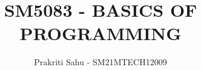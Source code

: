 \documentclass[journal,12pt,twocolumn]{IEEEtran}
\begin{document}
%


\newtheorem{theorem}{Theorem}[section]
\newtheorem{problem}{Problem}
\newtheorem{proposition}{Proposition}[section]
\newtheorem{lemma}{Lemma}[section]
\newtheorem{corollary}[theorem]{Corollary}
\newtheorem{example}{Example}[section]
\newtheorem{definition}[problem]{Definition}
\newcommand{\BEQA}{\begin{eqnarray}}
\newcommand{\EEQA}{\end{eqnarray}}
\newcommand{\define}{\stackrel{\triangle}{=}}

\providecommand{\mbf}{\mathbf}
\providecommand{\pr}[1]{\ensuremath{\Pr\left(#1\right)}}
\providecommand{\qfunc}[1]{\ensuremath{Q\left(#1\right)}}
\providecommand{\sbrak}[1]{\ensuremath{{}\left[#1\right]}}
\providecommand{\lsbrak}[1]{\ensuremath{{}\left[#1\right.}}
\providecommand{\rsbrak}[1]{\ensuremath{{}\left.#1\right]}}
\providecommand{\brak}[1]{\ensuremath{\left(#1\right)}}
\providecommand{\lbrak}[1]{\ensuremath{\left(#1\right.}}
\providecommand{\rbrak}[1]{\ensuremath{\left.#1\right)}}
\providecommand{\cbrak}[1]{\ensuremath{\left\{#1\right\}}}
\providecommand{\lcbrak}[1]{\ensuremath{\left\{#1\right.}}
\providecommand{\rcbrak}[1]{\ensuremath{\left.#1\right\}}}
\theoremstyle{remark}
\newtheorem{rem}{Remark}
\newcommand{\sgn}{\mathop{\mathrm{sign}}}
\providecommand{\abs}[1]{\left\vert#1\right\vert}
\providecommand{\res}[1]{\Res\displaylimits_{#1}} 
\providecommand{\norm}[1]{\left\lVert#1\right\rVert}
\providecommand{\mtx}[1]{\mathbf{#1}}
\providecommand{\mean}[1]{E\left[ #1 \right]}
\providecommand{\fourier}{\overset{\mathcal{F}}{ \rightleftharpoons}}
\providecommand{\system}{\overset{\mathcal{H}}{ \longleftrightarrow}}
\newcommand{\solution}{\noindent \textbf{Solution: }}
\newcommand{\cosec}{\,\text{cosec}\,}
\providecommand{\dec}[2]{\ensuremath{\overset{#1}{\underset{#2}{\gtrless}}}}
\newcommand{\myvec}[1]{\ensuremath{\begin{pmatrix}#1\end{pmatrix}}}
\newcommand{\cmyvec}[1]{\ensuremath{\begin{pmatrix*}[c]#1\end{pmatrix*}}}
\newcommand{\mydet}[1]{\ensuremath{\begin{vmatrix}#1\end{vmatrix}}}
\newcommand{\proj}[2]{\textbf{proj}_{\vec{#1}}\vec{#2}}
\let\StandardTheFigure\thefigure
\let\vec\mathbf
\title{
SM5083 - BASICS OF PROGRAMMING
}
\author{ Prakriti Sahu - SM21MTECH12009}
\maketitle
\end{document}
